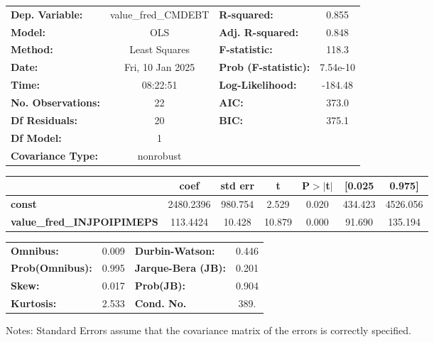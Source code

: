 \begin{center}
\begin{tabular}{lclc}
\toprule
\textbf{Dep. Variable:}            & value\_fred\_CMDEBT & \textbf{  R-squared:         } &     0.855   \\
\textbf{Model:}                    &         OLS         & \textbf{  Adj. R-squared:    } &     0.848   \\
\textbf{Method:}                   &    Least Squares    & \textbf{  F-statistic:       } &     118.3   \\
\textbf{Date:}                     &   Fri, 10 Jan 2025  & \textbf{  Prob (F-statistic):} &  7.54e-10   \\
\textbf{Time:}                     &       08:22:51      & \textbf{  Log-Likelihood:    } &   -184.48   \\
\textbf{No. Observations:}         &            22       & \textbf{  AIC:               } &     373.0   \\
\textbf{Df Residuals:}             &            20       & \textbf{  BIC:               } &     375.1   \\
\textbf{Df Model:}                 &             1       & \textbf{                     } &             \\
\textbf{Covariance Type:}          &      nonrobust      & \textbf{                     } &             \\
\bottomrule
\end{tabular}
\begin{tabular}{lcccccc}
                                   & \textbf{coef} & \textbf{std err} & \textbf{t} & \textbf{P$> |$t$|$} & \textbf{[0.025} & \textbf{0.975]}  \\
\midrule
\textbf{const}                     &    2480.2396  &      980.754     &     2.529  &         0.020        &      434.423    &     4526.056     \\
\textbf{value\_fred\_INJPOIPIMEPS} &     113.4424  &       10.428     &    10.879  &         0.000        &       91.690    &      135.194     \\
\bottomrule
\end{tabular}
\begin{tabular}{lclc}
\textbf{Omnibus:}       &  0.009 & \textbf{  Durbin-Watson:     } &    0.446  \\
\textbf{Prob(Omnibus):} &  0.995 & \textbf{  Jarque-Bera (JB):  } &    0.201  \\
\textbf{Skew:}          &  0.017 & \textbf{  Prob(JB):          } &    0.904  \\
\textbf{Kurtosis:}      &  2.533 & \textbf{  Cond. No.          } &     389.  \\
\bottomrule
\end{tabular}
\end{center}

Notes: \newline
 [1] Standard Errors assume that the covariance matrix of the errors is correctly specified.